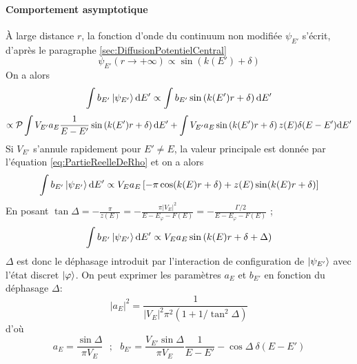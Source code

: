 \paragraph*{Comportement asymptotique} \`A large distance $r$, la fonction d'onde du continuum non modifiée $\psi_{E'}$ s'écrit, d'après le paragraphe \ref{sec:DiffusionPotentielCentral}
\begin{equation}
\psi_{E'}(r \rightarrow + \infty) \propto \sin \left( k(E') + \delta \right)
\end{equation}
On a alors
\begin{equation}
\int b_{E'} \ket{\psi_{E'}} \mathrm{d} E' \propto \int b_{E'} \sin \left( k(E')r + \delta \right) \mathrm{d} E'
\end{equation}
\begin{equation}
\propto \mathcal{P} \int V_{E'} a_E \frac{1}{E - E'} \sin \left( k(E')r + \delta \right) \mathrm{d} E' + \int V_{E'} a_E \sin \left( k(E')r + \delta \right) z(E) \delta(E-E') \mathrm{d} E'
\end{equation}
Si $V_{E'}$ s'annule rapidement pour $E' \neq E$, la valeur principale est donnée par l'équation \ref{eq:PartieReelleDeRho} et on a alors
\begin{equation}
\int b_{E'} \ket{\psi_{E'}} \mathrm{d} E' \propto V_E a_E \left[ - \pi \cos (k(E)r + \delta) + z(E) \sin(k(E)r + \delta) \right]
\end{equation}
En posant $\tan \Delta = - \frac{\pi}{z(E)} = - \frac{\pi |V_E|^2}{E - E_\varphi - F(E)} = - \frac{\Gamma / 2}{E - E_\varphi - F(E)}$ ;
\begin{equation}
\int b_{E'} \ket{\psi_{E'}} \mathrm{d} E' \propto V_E a_E \sin \left( k(E) r + \delta + \Delta \right)
\end{equation}
$\Delta$ est donc le déphasage introduit par l'interaction de configuration de $\ket{\psi_{E'}}$ avec l'état discret $\ket{\varphi}$. On peut exprimer les paramètres $a_E$ et $b_{E'}$ en fonction du déphasage $\Delta$:
\begin{equation}
|a_E|^2 = \frac{1}{|V_E|^2 \pi^2 \left( 1 + 1/\tan^2 \Delta \right)} 
\end{equation}
d'où
\begin{equation}
a_E = \frac{\sin \Delta}{\pi V_E} \: \: \: ; \: \: \: b_{E'} = \frac{V_{E'} \sin \Delta}{\pi V_E} \frac{1}{E - E'} - \cos \Delta \: \delta(E-E')
\label{eq:Expressions_aE_bE}
\end{equation}

